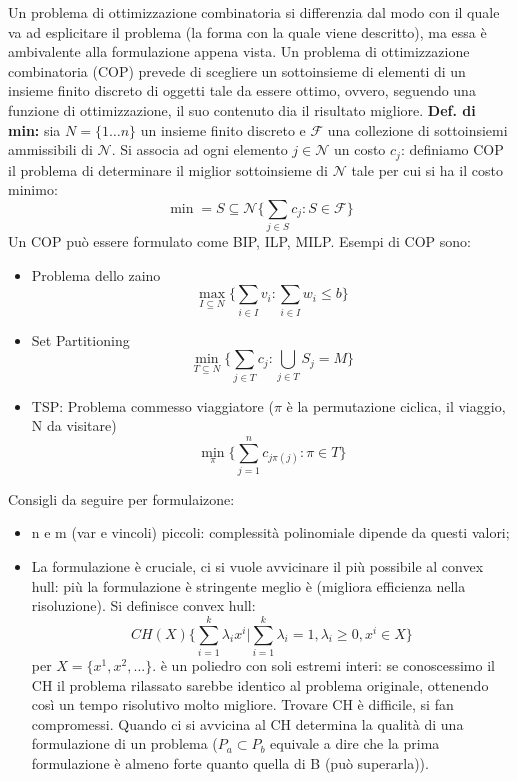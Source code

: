 Un problema di ottimizzazione combinatoria si differenzia dal modo con il quale va ad esplicitare il problema (la forma con la quale viene descritto), ma essa è ambivalente alla formulazione appena vista. Un problema di ottimizzazione combinatoria (COP) prevede di scegliere un sottoinsieme di elementi di un insieme finito discreto di oggetti tale da essere ottimo, ovvero, seguendo una funzione di ottimizzazione, il suo contenuto dia il risultato migliore.
\textbf{Def. di min:} sia $N=\{1\dots n\}$ un insieme finito discreto e $\mathcal{F}$ una collezione di sottoinsiemi ammissibili di $\mathcal{N}$. Si associa ad ogni elemento $j\in \mathcal{N}$ un costo $c_j$: definiamo COP il problema di determinare il miglior sottoinsieme di $\mathcal{N}$ tale per cui si ha il costo minimo:
\begin{equation}
	\min={S\subseteq \mathcal{N}}\{\sum_{j\in S}c_j:S\in \mathcal{F}\}
\end{equation}
Un COP può essere formulato come BIP, ILP, MILP. Esempi di COP sono:
\begin{itemize}
	\item Problema dello zaino \begin{equation}\max_{I\subseteq N}\{\sum_{i\in I}v_i:\sum_{i\in I}w_i\le b\}\end{equation}
	\item Set Partitioning \begin{equation}\min_{T\subseteq N}\{\sum_{j\in T}c_j:\bigcup_{j\in T}S_j=M\}\end{equation}
	\item TSP: Problema commesso viaggiatore ($\pi$ è la permutazione ciclica, il viaggio, N da visitare) \begin{equation}\min_{\pi}\{\sum_{j=1}^nc_{j\pi(j)}:\pi \in T\}\end{equation}
\end{itemize} 

Consigli da seguire per formulaizone:
\begin{itemize}
	\item n e m (var e vincoli) piccoli: complessità polinomiale dipende da questi valori;
	\item La formulazione è cruciale, ci si vuole avvicinare il più possibile al convex hull: più la formulazione è stringente meglio è (migliora efficienza nella risoluzione). Si definisce convex hull: \begin{equation}CH(X)\{\sum_{i=1}^k\lambda_ix^i|\sum_{i=1}^k\lambda_i=1, \lambda_i\ge 0, x^i \in X\}\end{equation}
	per $X=\{x^1, x^2,...\}$. è un poliedro con soli estremi interi: se conoscessimo il CH il problema rilassato sarebbe identico al problema originale, ottenendo così un tempo risolutivo molto migliore. Trovare CH è difficile, si fan compromessi. Quando ci si avvicina al CH determina la qualità di una formulazione di un problema ($P_a\subset P_b$ equivale a dire che la prima formulazione è almeno forte quanto quella di B (può superarla)).
\end{itemize}

